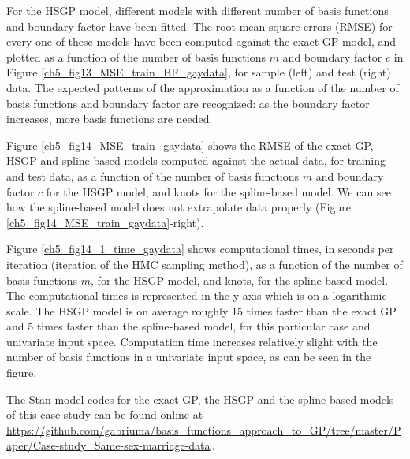 \documentclass[onecolumn,a4paper,11pt]{article}
\begin{document}
For the HSGP model, different models with different number of basis functions and boundary factor have been fitted. The root mean square errors (RMSE) for every one of these models have been computed against the exact GP model, and plotted as a function of the number of basis functions $m$ and boundary factor $c$ in Figure \ref{ch5_fig13_MSE_train_BF_gaydata}, for sample (left) and test (right) data. The expected patterns of the approximation as a function of the number of basis functions and boundary factor are recognized: as the boundary factor increases, more basis functions are needed.

Figure \ref{ch5_fig14_MSE_train_gaydata} shows the RMSE of the exact GP, HSGP and spline-based models computed against the actual data, for training and test data, as a function of the number of basis functions $m$ and boundary factor $c$ for the HSGP model, and  knots for the spline-based model. We can see how the spline-based model does not extrapolate data properly (Figure \ref{ch5_fig14_MSE_train_gaydata}-right). 

Figure \ref{ch5_fig14_1_time_gaydata} shows computational times, in seconds per iteration (iteration of the HMC sampling method), as a function of the number of basis functions $m$, for the HSGP model, and knots, for the spline-based model. The computational times is represented in the y-axis which is on a logarithmic scale. The HSGP model is on average roughly 15 times faster than the exact GP and 5 times faster than the spline-based model, for this particular case and univariate input space. Computation time increases relatively slight with the number of basis functions in a univariate input space, as can be seen in the figure.

The Stan model codes for the exact GP, the HSGP and the spline-based models of this case study can be found online at {\small \url{https://github.com/gabriuma/basis_functions_approach_to_GP/tree/master/Paper/Case-study_Same-sex-marriage-data}}\,.

\end{document}
